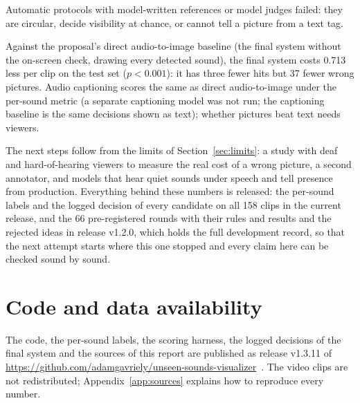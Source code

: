 \begin{description}[style=nextline]
        Automatic protocols with model-written references or model judges failed: they are circular, decide visibility
        at chance, or cannot tell a picture from a text tag.
  \item[RQ5 -- comparison with audio-to-visual approaches?] Against the proposal's direct audio-to-image baseline (the
        final system without the on-screen check, drawing every detected sound), the final system costs 0.713 less per clip on the test set
        ($p < 0.001$): it has three fewer hits but 37 fewer wrong pictures. Audio captioning scores the same as direct
        audio-to-image under the per-sound metric (a separate captioning model was not run; the captioning baseline is
        the same decisions shown as text); whether pictures beat text needs viewers.
\end{description}

The next steps follow from the limits of Section~\ref{sec:limits}: a study with deaf and hard-of-hearing viewers to
measure the real cost of a wrong picture, a second annotator, and models that hear quiet sounds under speech and tell
presence from production. Everything behind these numbers is released: the per-sound labels and the logged decision
of every candidate on all 158 clips in the current release, and the 66 pre-registered rounds with their rules and
results and the rejected ideas in release v1.2.0, which holds the full development record, so that the next attempt
starts where this one stopped and every claim here can be checked sound by sound.

\section*{Code and data availability}\label{sec:availability}
The code, the per-sound labels, the scoring harness, the logged decisions of the final system and the sources of this
report are published as release v1.3.11 of \url{https://github.com/adamgavriely/unseen-sounds-visualizer}~\cite{gavriely2026code}.
The video clips are not redistributed; Appendix~\ref{app:sources} explains how to reproduce every number.
